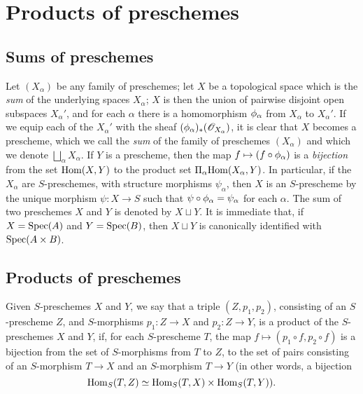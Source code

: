 \section{Products of preschemes}
\label{section:products-of-preschemes}

\subsection{Sums of preschemes}
\label{subsection:sums-of-preschemes}

Let $(X_\alpha)$ be any family of preschemes; let $X$ be a topological space which is the
\emph{sum} of the underlying spaces $X_\alpha$; $X$ is then the union of pairwise
disjoint open subspaces $X_\alpha'$, and for each $\alpha$ there is a homomorphism
$\phi_\alpha$ from $X_\alpha$ to $X_\alpha'$. If we equip each of the $X_\alpha'$ with the
sheaf $(\phi_\alpha)_*(\mathscr{O}_{X_\alpha})$, it is clear that $X$ becomes a prescheme, which
we call the \emph{sum} of the family of preschemes $(X_\alpha)$ and which we denote
$\bigsqcup_\alpha X_\alpha$. If $Y$ is a prescheme, then the map $f\mapsto(f\circ\vphi_\alpha)$ is a
\emph{bijection} from the set ${\mathop{\mathrm{Hom}}\nolimits}(X,Y)$ to the product set $\Pi_\alpha{\mathop{\mathrm{Hom}}\nolimits}(X_\alpha,Y)$.
In particular, if the $X_\alpha$ are $S$-preschemes, with structure morphisms $\psi_\alpha$, then
$X$ is an $S$-prescheme by the unique morphism $\psi:X\to S$ such that
$\psi\circ\phi_\alpha=\psi_\alpha$ for each $\alpha$. The sum of two preschemes $X$ and $Y$ is
denoted by $X\sqcup Y$. It is immediate that, if $X={\mathop{\mathrm{Spec}}\nolimits}(A)$ and $Y={\mathop{\mathrm{Spec}}\nolimits}(B)$, then $X\sqcup Y$
is canonically identified with ${\mathop{\mathrm{Spec}}\nolimits}(A\times B)$.

\subsection{Products of preschemes}
\label{subsection:products-of-preschemes}

\begin{defn}[3.2.1]
\label{1.3.2.1}
Given $S$-preschemes $X$ and $Y$, we say that a triple $(Z,p_1,p_2)$, consisting of an
$S$-prescheme $Z$, and $S$-morphisms $p_1:Z\to X$ and $p_2:Z\to Y$, is a product of the
$S$-preschemes $X$ and $Y$, if, for each $S$-prescheme $T$, the map
$f\mapsto(p_1\circ f,p_2\circ f)$ is a bijection from the set of $S$-morphisms from $T$ to
$Z$, to the set of pairs consisting of an $S$-morphism $T\to X$ and an $S$-morphism $T\to Y$
(in other words, a bijection
\[
  {\mathop{\mathrm{Hom}}\nolimits}_S(T,Z)\simeq{\mathop{\mathrm{Hom}}\nolimits}_S(T,X)\times{\mathop{\mathrm{Hom}}\nolimits}_S(T,Y)).
\]
\end{defn}

